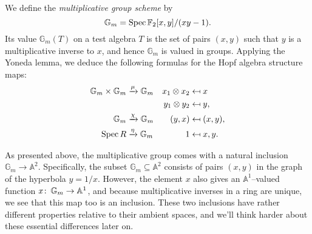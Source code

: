 \begin{example}
We define the \textit{multiplicative group scheme} by \[\mathbb G_m = \operatorname{Spec} \mathbb F_2[x, y] / (xy - 1).\]  Its value $\mathbb G_m(T)$ on a test algebra $T$ is the set of pairs $(x, y)$ such that $y$ is a multiplicative inverse to $x$, and hence $\mathbb G_m$ is valued in groups.  Applying the Yoneda lemma, we deduce the following formulas for the Hopf algebra structure maps:
\begin{align*}
\mathbb G_m \times \mathbb G_m & \xrightarrow{\mu} \mathbb G_m & x_1 \otimes x_2 & \mapsfrom x \\
& & y_1 \otimes y_2 & \mapsfrom y, \\
\mathbb G_m & \xrightarrow{\chi} \mathbb G_m & (y, x) & \mapsfrom (x, y), \\
\operatorname{Spec} R & \xrightarrow{\eta} \mathbb G_m & 1 & \mapsfrom x, y.
\end{align*}
\end{example}

\begin{remark}
As presented above, the multiplicative group comes with a natural inclusion $\mathbb G_m \to \mathbb A^2$.  Specifically, the subset $\mathbb G_m \subseteq \mathbb A^2$ consists of pairs $(x, y)$ in the graph of the hyperbola $y = 1/x$.  However, the element $x$ also gives an $\mathbb A^1$--valued function $x\colon\thinspace \mathbb G_m \to \mathbb A^1$, and because multiplicative inverses in a ring are unique, we see that this map too is an inclusion.  These two inclusions have rather different properties relative to their ambient spaces, and we'll think harder about these essential differences later on.
\end{remark}

